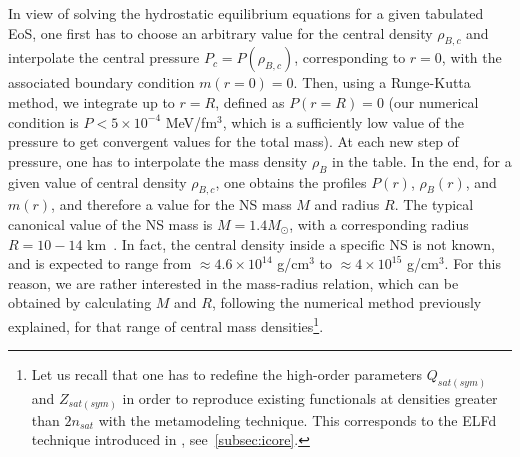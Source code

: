 In view of solving the hydrostatic equilibrium equations for a given tabulated 
EoS, one first has to choose an arbitrary value for the central density 
$\rho_{B,c}$ and 
interpolate the central pressure $P_c = P(\rho_{B,c})$, corresponding to $r=0$, 
with the associated boundary condition $m(r=0) = 0$. Then, using a Runge-Kutta 
method, we integrate up to $r=R$, defined as $P(r=R) = 0$ (our numerical 
condition is $P < 5\times 10^{-4}$ MeV/fm$^{3}$, which is a sufficiently low 
value of the pressure to get convergent values for the total mass). At each new 
step of pressure, one has to interpolate 
the mass density $\rho_B$ in the table. In the end, for a given value of 
central density $\rho_{B,c}$, one obtains the profiles $P(r)$, $\rho_B(r)$, 
and $m(r)$, and therefore a value for the NS mass $M$ and radius $R$. The 
typical canonical value of the NS mass is $M=1.4M_\odot$, with a corresponding
radius $R=10-14$ km~\cite{Haensel2007}. 
In fact, the central density inside a specific NS is not known, and is expected
to range from $\approx 4.6\times 10^{14}$ g/cm$^3$ to $\approx 4\times 10^{15}$
g/cm$^3$. For this reason, we are rather interested in the mass-radius 
relation, which can be obtained by calculating $M$ and $R$, following the 
numerical method previously explained, for that range of central mass 
densities\footnote{Let us recall that one has to redefine the high-order 
  parameters $Q_{sat(sym)}$ and $Z_{sat(sym)}$ in order to reproduce existing 
  functionals at densities greater than $2n_{sat}$ with the metamodeling 
  technique. This corresponds to the ELFd technique introduced 
in \cite{Margueron2018a}, see~\ref{subsec:icore}.}.

